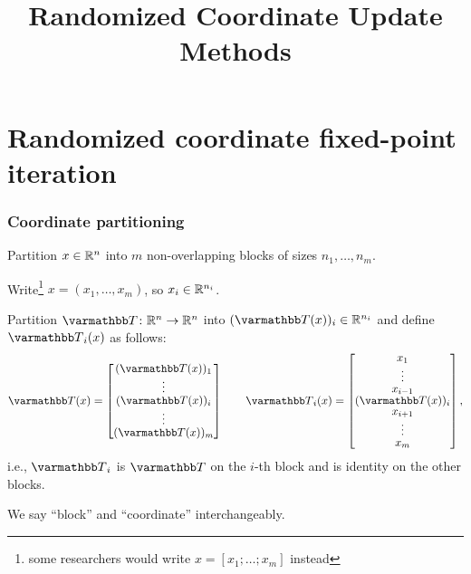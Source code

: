 \documentclass[10pt,mathserif]{beamer}
\title{\large \bfseries Randomized Coordinate Update Methods}
\begin{document}
\frame{
\thispagestyle{empty}
\titlepage
}



\section{Randomized coordinate fixed-point iteration}


\begin{frame}
\frametitle{Coordinate partitioning}
Partition $x\in \mathbb{R}^n$ into $m$ non-overlapping blocks of sizes $n_1,\dots,n_m$.
\medskip\pause 

Write\footnote{some researchers would write $x=[x_1;\dots; x_m]$ instead} $x=(x_1,\dots,x_m)$,
so $x_i\in \mathbb{R}^{n_i}$.
\medskip

Partition $\opT\colon\reals^n\rightarrow\reals^n$ into $(\opT(x))_i\in \reals^{n_i}$ and define $\opT_i(x)$ as follows:
\[
\opT(x)=\begin{bmatrix}
(\opT(x))_1\\
\vdots\\
(\opT(x))_i\\
\vdots\\
(\opT(x))_m
\end{bmatrix}
\qquad
\begingroup
\renewcommand*{\arraystretch}{.8}
\opT_i(x)=\begin{bmatrix}
x_1\\
\vdots\\
x_{i-1}\\
(\opT(x))_i\\
x_{i+1}\\
\vdots\\
x_m
\end{bmatrix},
\endgroup
\]
i.e., $\opT_i$ is $\opT$ on the $i$\nobreakdash-th block and is identity on the other blocks.

\medskip
We say ``block''  and ``coordinate'' interchangeably.
\end{frame}
\end{document}
